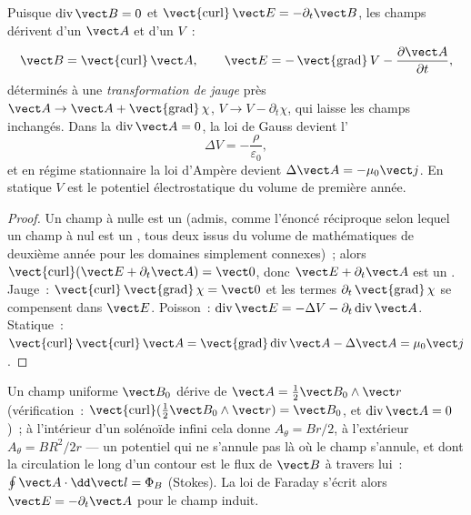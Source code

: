 \begin{proposition}\label{prop:b2:maxwell-equations:potentials}
Puisque $\operatorname{div}\vect B = 0$ et $\operatorname{\vect{curl}}\vect E = -\partial_t
\vect B$, les champs dérivent d'un \emph{} $\vect A$ et d'un
\emph{} $V$~:
\[
\vect B = \operatorname{\vect{curl}}\vect A , \qquad
\vect E = -\operatorname{\vect{grad}}V - \frac{\partial\vect A}{\partial t} ,
\]
déterminés à une \emph{transformation de jauge} près $\vect A \to \vect A +
\operatorname{\vect{grad}}\chi$, $V \to V - \partial_t\chi$, qui laisse les champs
inchangés. Dans la \emph{} $\operatorname{div}\vect A = 0$, la loi de
Gauss devient l'\emph{}
\[
\Delta V = -\frac\rho{\varepsilon_0} ,
\]
et en régime stationnaire la loi d'Ampère devient $\Delta\vect A = -\mu_0\vect j$.
En statique $V$ est le potentiel électrostatique du volume de première année.
\end{proposition}

\begin{proof}
Un champ à  nulle est un  (admis, comme l'énoncé
réciproque selon lequel un champ à  nul est un , tous deux issus du volume de
mathématiques de deuxième année pour les domaines simplement connexes)~; alors $\operatorname{\vect{curl}}
(\vect E + \partial_t\vect A) = \vect 0$, donc $\vect E + \partial_t\vect A$ est un .
Jauge~: $\operatorname{\vect{curl}}\operatorname{\vect{grad}}\chi = \vect 0$ et les
termes $\partial_t\operatorname{\vect{grad}}\chi$ se compensent dans $\vect E$. Poisson~: $\operatorname{div}
\vect E = -\Delta V - \partial_t\operatorname{div}\vect A$. Statique~: $\operatorname{\vect{curl}}
\operatorname{\vect{curl}}\vect A = \operatorname{\vect{grad}}\operatorname{div}\vect A - \Delta\vect A
= \mu_0\vect j$.
\end{proof}

\begin{example}\label{ex:b2:maxwell-equations:vectorpot}
Un champ uniforme $\vect B_0$ dérive de $\vect A = \tfrac12\vect B_0\wedge\vect r$
(vérification~: $\operatorname{\vect{curl}}(\tfrac12\vect B_0\wedge\vect r) = \vect B_0$, et
$\operatorname{div}\vect A = 0$)~; à l'intérieur d'un solénoïde infini cela donne $A_\theta =
Br/2$, à l'extérieur $A_\theta = BR^2/2r$ --- un potentiel qui ne s'annule pas
là où le champ s'annule, et dont la circulation le long d'un contour est le flux
de $\vect B$ à travers lui~: $\oint\vect A\cdot\dd\vect l = \Phi_B$ (Stokes). La loi de
Faraday s'écrit alors $\vect E = -\partial_t\vect A$ pour le champ induit.
\end{example}

